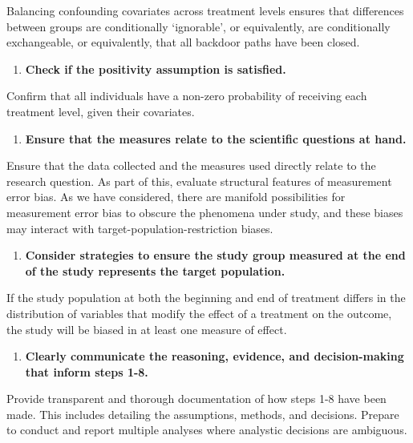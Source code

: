 \documentclass[
  single column]{article}
\providecommand{\tightlist}{%
  \setlength{\itemsep}{0pt}\setlength{\parskip}{0pt}}\usepackage{longtable,booktabs,array}
\begin{document}
Balancing confounding covariates across treatment levels ensures that
differences between groups are conditionally `ignorable', or
equivalently, are conditionally exchangeable, or equivalently, that all
backdoor paths have been closed.

\begin{enumerate}
\def\labelenumi{\arabic{enumi}.}
\setcounter{enumi}{5}
\tightlist
\item
  \textbf{Check if the positivity assumption is satisfied.}
\end{enumerate}

Confirm that all individuals have a non-zero probability of receiving
each treatment level, given their covariates.

\begin{enumerate}
\def\labelenumi{\arabic{enumi}.}
\setcounter{enumi}{6}
\tightlist
\item
  \textbf{Ensure that the measures relate to the scientific questions at
  hand.}
\end{enumerate}

Ensure that the data collected and the measures used directly relate to
the research question. As part of this, evaluate structural features of
measurement error bias. As we have considered, there are manifold
possibilities for measurement error bias to obscure the phenomena under
study, and these biases may interact with target-population-restriction
biases.

\begin{enumerate}
\def\labelenumi{\arabic{enumi}.}
\setcounter{enumi}{7}
\tightlist
\item
  \textbf{Consider strategies to ensure the study group measured at the
  end of the study represents the target population.}
\end{enumerate}

If the study population at both the beginning and end of treatment
differs in the distribution of variables that modify the effect of a
treatment on the outcome, the study will be biased in at least one
measure of effect.

\begin{enumerate}
\def\labelenumi{\arabic{enumi}.}
\setcounter{enumi}{8}
\tightlist
\item
  \textbf{Clearly communicate the reasoning, evidence, and
  decision-making that inform steps 1-8.}
\end{enumerate}

Provide transparent and thorough documentation of how steps 1-8 have
been made. This includes detailing the assumptions, methods, and
decisions. Prepare to conduct and report multiple analyses where
analystic decisions are ambiguous.
\end{document}
